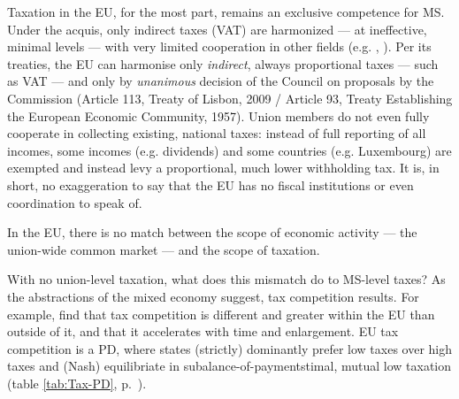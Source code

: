 \documentclass[11pt,a4paper,oneside]{article}
\begin{document}


Taxation in the \gls{EU}, for the most part, remains an exclusive competence for \gls{MS}. Under the acquis, only indirect taxes (VAT) are harmonized --- at ineffective, minimal levels --- with very limited cooperation in other fields (e.g. \citealt{EuropeanCommission2009}, \citealt{TaxCoordinationandTaxCompetitionintheEuropeanUnion-EvaluatingtheCodeofConductonBusinessTaxation2001}).
Per its treaties, the \gls{EU} can harmonise only \emph{indirect}, always proportional taxes --- such as \gls{VAT} --- and only by \emph{unanimous} decision of the Council on proposals by the Commission (Article 113, Treaty of Lisbon, 2009 / Article 93, Treaty Establishing the European Economic Community, 1957).
Union members do not even fully cooperate in collecting existing, national taxes:
instead of full reporting of all incomes, some incomes (e.g. dividends) and some countries (e.g. Luxembourg) are exempted and instead levy a proportional, much lower withholding tax.
It is, in short, no exaggeration to say that the \gls{EU} has no fiscal institutions or even coordination to speak of.

In the \gls{EU}, there is no match between the scope of economic activity --- the union-wide common market --- and the scope of taxation.

With no union-level taxation, what does this mismatch do to
\gls{MS}-level taxes?
As the abstractions of the mixed economy suggest, tax competition results.
For example, \cite{Genschel2009} find that tax competition is different and greater within the \gls{EU} than outside of it, and that it accelerates with time and enlargement.
\gls{EU} tax competition is a \gls{PD}, where states (strictly) dominantly prefer low taxes over high taxes and (Nash) equilibriate in subalance-of-paymentstimal, mutual low taxation (table \ref{tab:Tax-PD}, p.~\pageref{tab:Tax-PD}).
\end{document}
